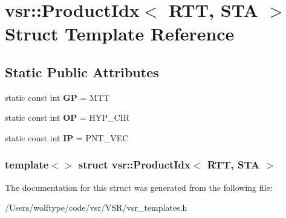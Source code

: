 \hypertarget{structvsr_1_1_product_idx_3_01_r_t_t_00_01_s_t_a_01_4}{\section{vsr\-:\-:Product\-Idx$<$ R\-T\-T, S\-T\-A $>$ Struct Template Reference}
\label{structvsr_1_1_product_idx_3_01_r_t_t_00_01_s_t_a_01_4}
}
\subsection*{Static Public Attributes}
\begin{DoxyCompactItemize}
\item 
\hypertarget{structvsr_1_1_product_idx_3_01_r_t_t_00_01_s_t_a_01_4_a4321757fd9b281bff15c723b658bdc65}{static const int {\bfseries G\-P} = M\-T\-T}\label{structvsr_1_1_product_idx_3_01_r_t_t_00_01_s_t_a_01_4_a4321757fd9b281bff15c723b658bdc65}

\item 
\hypertarget{structvsr_1_1_product_idx_3_01_r_t_t_00_01_s_t_a_01_4_a08b159adedd77830be6aa079f28c9800}{static const int {\bfseries O\-P} = H\-Y\-P\-\_\-\-C\-I\-R}\label{structvsr_1_1_product_idx_3_01_r_t_t_00_01_s_t_a_01_4_a08b159adedd77830be6aa079f28c9800}

\item 
\hypertarget{structvsr_1_1_product_idx_3_01_r_t_t_00_01_s_t_a_01_4_a4e1352f61cc463091e2bc1d2ac520df1}{static const int {\bfseries I\-P} = P\-N\-T\-\_\-\-V\-E\-C}\label{structvsr_1_1_product_idx_3_01_r_t_t_00_01_s_t_a_01_4_a4e1352f61cc463091e2bc1d2ac520df1}

\end{DoxyCompactItemize}
\subsubsection*{template$<$$>$ struct vsr\-::\-Product\-Idx$<$ R\-T\-T, S\-T\-A $>$}



The documentation for this struct was generated from the following file\-:\begin{DoxyCompactItemize}
\item 
/\-Users/wolftype/code/vsr/\-V\-S\-R/vsr\-\_\-templates.\-h\end{DoxyCompactItemize}

